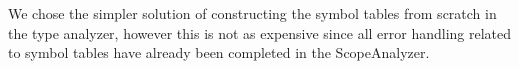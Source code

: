 We chose the simpler solution of constructing the symbol tables from scratch in the type analyzer, however this is not as expensive since all error handling related to symbol tables
have already been completed in the ScopeAnalyzer.

